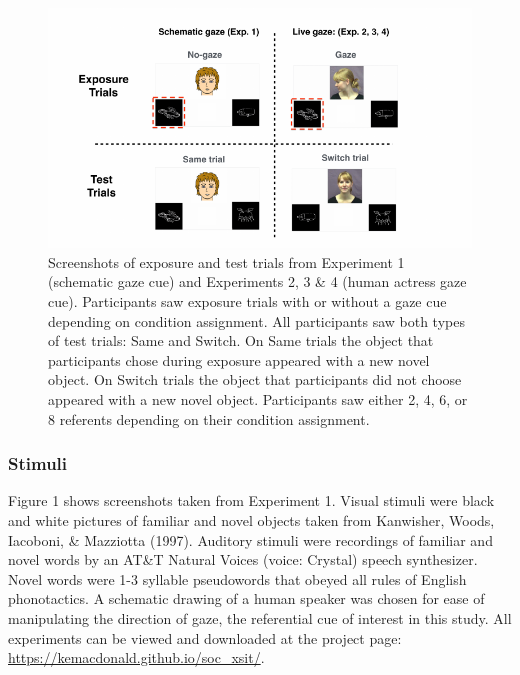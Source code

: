 \documentclass[authoryear, review]{elsarticle}
\newenvironment{CodeChunk}{}{}
\begin{document}
\begin{CodeChunk}
\begin{figure}[tb]
\includegraphics{figs/stimuli-1} \caption[Screenshots of exposure and test trials from Experiment 1 (schematic gaze cue) and Experiments 2, 3 \& 4 (human actress gaze cue)]{Screenshots of exposure and test trials from Experiment 1 (schematic gaze cue) and Experiments 2, 3 \& 4 (human actress gaze cue). Participants saw exposure trials with or without a gaze cue depending on condition assignment. All participants saw both types of test trials: Same and Switch. On Same trials the object that participants chose during exposure appeared with a new novel object. On Switch trials the object that participants did not choose appeared with a new novel object. Participants saw either 2, 4, 6, or 8 referents depending on their condition assignment.}\label{fig:stimuli}
\end{figure}
\end{CodeChunk}

\subsubsection{Stimuli}\label{stimuli}

Figure 1 shows screenshots taken from Experiment 1. Visual stimuli were
black and white pictures of familiar and novel objects taken from
Kanwisher, Woods, Iacoboni, \& Mazziotta (1997). Auditory stimuli were
recordings of familiar and novel words by an AT\&T Natural Voices
\texttrademark (voice: Crystal) speech synthesizer. Novel words were 1-3
syllable pseudowords that obeyed all rules of English phonotactics. A
schematic drawing of a human speaker was chosen for ease of manipulating
the direction of gaze, the referential cue of interest in this study.
All experiments can be viewed and downloaded at the project page:
\url{https://kemacdonald.github.io/soc_xsit/}.
\end{document}
